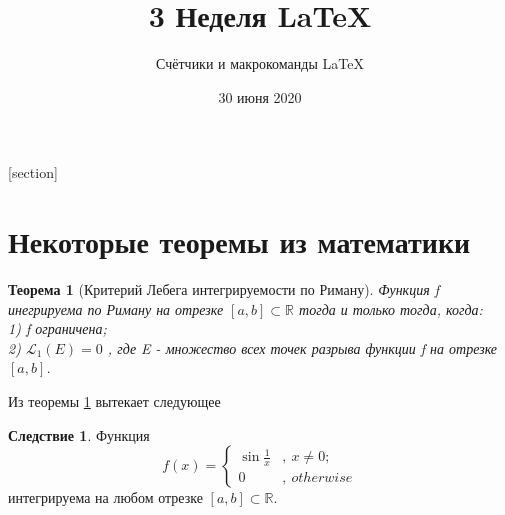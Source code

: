 \documentclass[a4paper,12pt]{article}
\author{Счётчики и макрокоманды \LaTeX{}}
\title{3 Неделя \LaTeX{}}
\date{30 июня 2020}
\newtheorem{theorem}{Теорема}[section]
\theoremstyle{definition} %
\newtheorem{corollary}{Следствие}[theorem]
\theoremstyle{remark} %
\begin{document}

\maketitle


[section]


\newcommand{\z}[1]{%

\addtocounter{nc}{1} %
\textit{\textbf{Задача \thesection.\arabic{nc}.}}\\ #1 \\%
}



\renewcommand{\thesection}{\Roman{section}}


\section{Некоторые теоремы из математики}\label{sec:math_theorems}

\newcommand{\subsetR}[1]{\ensuremath{%
#1 \subset \mathbb{R}}%
} %


\newcommand{\subsetRn}[1]{\ensuremath{%
#1 \subset \mathbb{R}^n}%
}


\newcommand{\Lmz}[1]{\ensuremath{%
\mathscr{L}_1 (#1) = 0}%
}


\newcommand{\str}[1]{%
на стр. #1%
}

\renewcommand{\le}{\leqslant}


\begin{theorem}[Критерий Лебега интегрируемости по Риману]\label{Lebesgue_and_Riemann}
	Функция f инегрируема по Риману на отрезке \subsetR{[a, b]} тогда и только тогда, когда:\\
	1) f ограничена; \\
	2) \Lmz{E}, где E - множество всех точек разрыва функции f на отрезке $[a, b]$.
\end{theorem}

Из теоремы \ref{Lebesgue_and_Riemann} вытекает следующее

\begin{corollary}
Функция
\begin{equation}
f(x) =
\left\{
	\begin{aligned}
		\sin \frac{1}{x}&, \  x \neq 0; \\
		0&, \  otherwise
	\end{aligned}
\right.
\end{equation}
интегрируема на любом отрезке $[a, b] \subset \mathbb{R}$.
\end{corollary}
\end{document}

